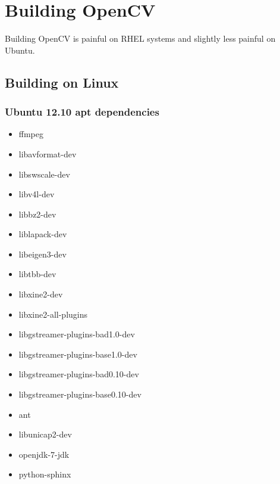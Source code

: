 \documentclass[12pt]{report}
\begin{document}
\section*{Building OpenCV}

Building OpenCV is painful on RHEL systems and slightly less painful on Ubuntu.

\subsection*{Building on Linux}

\subsubsection{Ubuntu 12.10 apt dependencies}
\begin{itemize}
\item ffmpeg
\item libavformat-dev
\item libswscale-dev
\item libv4l-dev
\item libbz2-dev
\item liblapack-dev
\item libeigen3-dev
\item libtbb-dev
\item libxine2-dev
\item libxine2-all-plugins
\item libgstreamer-plugins-bad1.0-dev
\item libgstreamer-plugins-base1.0-dev
\item libgstreamer-plugins-bad0.10-dev
\item libgstreamer-plugins-base0.10-dev
\item ant
\item libunicap2-dev
\item openjdk-7-jdk
\item python-sphinx
\end{itemize}
\end{document}
